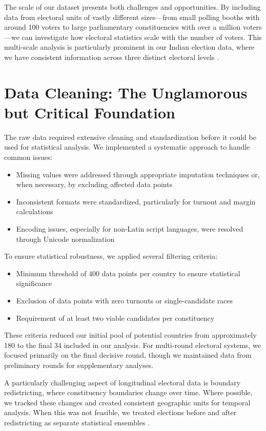The scale of our dataset presents both challenges and opportunities. By including data from electoral units of vastly different sizes—from small polling booths with around 100 voters to large parliamentary constituencies with over a million voters—we can investigate how electoral statistics scale with the number of voters. This multi-scale analysis is particularly prominent in our Indian election data, where we have consistent information across three distinct electoral levels \cite{mantovani2011scaling}.

\section{Data Cleaning: The Unglamorous but Critical Foundation}

The raw data required extensive cleaning and standardization before it could be used for statistical analysis. We implemented a systematic approach to handle common issues:

\begin{itemize}
    \item Missing values were addressed through appropriate imputation techniques or, when necessary, by excluding affected data points
    \item Inconsistent formats were standardized, particularly for turnout and margin calculations
    \item Encoding issues, especially for non-Latin script languages, were resolved through Unicode normalization
\end{itemize}

To ensure statistical robustness, we applied several filtering criteria:
\begin{itemize}
    \item Minimum threshold of 400 data points per country to ensure statistical significance \cite{BorRayBou2012}
    \item Exclusion of data points with zero turnouts or single-candidate races
    \item Requirement of at least two viable candidates per constituency
\end{itemize}

These criteria reduced our initial pool of potential countries from approximately 180 to the final 34 included in our analysis. For multi-round electoral systems, we focused primarily on the final decisive round, though we maintained data from preliminary rounds for supplementary analyses.

A particularly challenging aspect of longitudinal electoral data is boundary redistricting, where constituency boundaries change over time. Where possible, we tracked these changes and created consistent geographic units for temporal analysis. When this was not feasible, we treated elections before and after redistricting as separate statistical ensembles \cite{BraDeA2017}.


